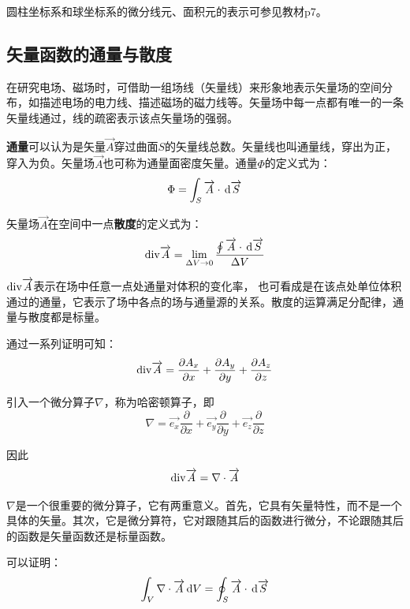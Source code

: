 \documentclass[UTF8,a4paper,11pt]{article}
\begin{document}
圆柱坐标系和球坐标系的微分线元、面积元的表示可参见教材p7。

\subsection{矢量函数的通量与散度}
在研究电场、磁场时，可借助一组场线（矢量线）来形象地表示矢量场的空间分布，如描述电场的电力线、描述磁场的磁力线等。矢量场中每一点都有唯一的一条矢量线通过，线的疏密表示该点矢量场的强弱。

\textbf{通量}可以认为是矢量$\overrightarrow{A}$穿过曲面$S$的矢量线总数。矢量线也叫通量线，穿出为正，穿入为负。矢量场$\overrightarrow{A}$也可称为通量面密度矢量。通量$\Phi$的定义式为：
\begin{equation}
\Phi=\int_S {\overrightarrow{A}}\cdot \,{\rm d}\overrightarrow{S}
\end{equation}

矢量场$\overrightarrow{A}$在空间中一点\textbf{散度}的定义式为：
\begin{equation}
{\rm div}\overrightarrow{A}=\lim_{\Delta V \to 0} \frac{\oint {\overrightarrow{A}}\cdot \,{\rm d}\overrightarrow{S}}{\Delta V}
\end{equation}

${\rm div}\overrightarrow{A}$表示在场中任意一点处通量对体积的变化率， 也可看成是在该点处单位体积通过的通量，它表示了场中各点的场与通量源的关系。散度的运算满足分配律，通量与散度都是标量。

通过一系列证明可知：
\begin{equation}
{\rm div}\overrightarrow{A}=\frac{\partial A_x}{\partial x}+\frac{\partial A_y}{\partial y}+\frac{\partial A_z}{\partial z}
\end{equation}

引入一个微分算子$\nabla$，称为哈密顿算子，即
\begin{equation}
\nabla=\overrightarrow{e_x}\frac{\partial}{\partial x}+\overrightarrow{e_y}\frac{\partial}{\partial y}+\overrightarrow{e_z}\frac{\partial}{\partial z}
\end{equation}

因此
\begin{equation}
{\rm div}\overrightarrow{A}=\nabla\cdot\overrightarrow{A}
\end{equation}

$\nabla$是一个很重要的微分算子，它有两重意义。首先，它具有矢量特性，而不是一个具体的矢量。其次，它是微分算符，它对跟随其后的函数进行微分，不论跟随其后的函数是矢量函数还是标量函数。

可以证明：
\begin{equation}
\int_V \nabla\cdot\overrightarrow{A} \,{\rm d}V=\oint_S {\overrightarrow{A}}\cdot \,{\rm d}\overrightarrow{S}
\end{equation}
\end{document}
